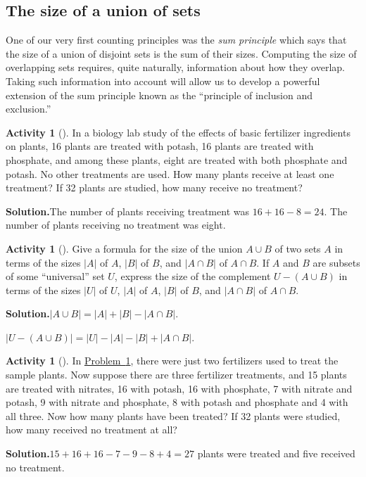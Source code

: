 \documentclass[10pt,]{book}
\theoremstyle{plain}
\theoremstyle{definition}
\newtheorem{activity}[project]{Activity}
\numberwithin{equation}{chapter}
\begin{document}
\subsection[{The size of a union of sets}]{The size of a union of sets}\label{subsection-34}
One of our very first counting principles was the \emph{sum principle} which says that the size of a union of disjoint sets is the sum of their sizes. Computing the size of overlapping sets requires, quite naturally, information about how they overlap. Taking such information into account will allow us to develop a powerful extension of the sum principle known as the ``principle of inclusion and exclusion.''%
\begin{activity}[]\label{fertilizer2}
In a biology lab study of the effects of basic fertilizer ingredients on plants, 16 plants are treated with potash, 16 plants are treated with phosphate, and among these plants, eight are treated with both phosphate and potash. No other treatments are used. How many plants receive at least one treatment? If 32 plants are studied, how many receive no treatment?%
\par\medskip\noindent%
\textbf{Solution.}\quad The number of plants receiving treatment was \(16+16-8 = 24\). The number of plants receiving no treatment was eight.%
\end{activity}
\begin{activity}[]\label{activity-99}
Give a formula for the size of the union \(A\cup B\) of two sets \(A\) in terms of the sizes \(|A|\) of \(A\), \(|B|\) of \(B\), and \(|A\cap B|\) of \(A\cap B\). If \(A\) and \(B\) are subsets of some ``universal'' set \(U\), express the size of the complement \(U-(A\cup B)\) in terms of the sizes \(|U|\) of \(U\), \(|A|\) of \(A\), \(|B|\) of \(B\), and \(|A\cap B|\) of \(A\cap B\).%
\par\medskip\noindent%
\textbf{Solution.}\quad \(|A\cup B|=|A| + |B| - |A\cap B|\).%
\par
\(|U-(A\cup B)| = |U|-|A|-|B| + |A
\cap B|\).%
\end{activity}
\begin{activity}[]\label{activity-100}
In \hyperref[fertilizer2]{Problem~\ref{fertilizer2}}, there were just two fertilizers used to treat the sample plants. Now suppose there are three fertilizer treatments, and 15 plants are treated with nitrates, 16 with potash, 16 with phosphate, 7 with nitrate and potash, 9 with nitrate and phosphate, 8 with potash and phosphate and 4 with all three. Now how many plants have been treated? If 32 plants were studied, how many received no treatment at all?%
\par\medskip\noindent%
\textbf{Solution.}\quad \(15+16+16-7-9-8+4=27\) plants were treated and five received no treatment.%
\end{activity}
\end{document}
